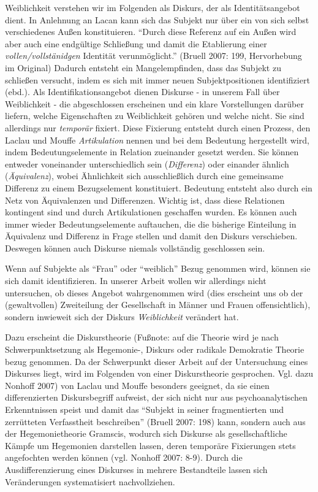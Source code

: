 \documentclass[12pt, titlepage=true, toc=bib]{scrartcl}
\begin{document}
Weiblichkeit verstehen wir im Folgenden als Diskurs, der als Identitätsangebot dient. In Anlehnung an Lacan kann sich das Subjekt nur über ein von sich selbst verschiedenes Außen konstituieren. "`Durch diese Referenz auf ein Außen wird aber auch eine endgültige Schließung und damit die Etablierung einer \textit{vollen/vollstänidgen} Identität verunmöglicht."' (Bruell 2007: 199, Hervorhebung im Original) Dadurch entsteht ein Mangelempfinden, dass das Subjekt zu schließen versucht, indem es sich mit immer neuen Subjektpositionen identifiziert (ebd.). Als Identifikationsangebot dienen Diskurse - in unserem Fall über Weiblichkeit - die abgeschlossen erscheinen und ein klare Vorstellungen darüber liefern, welche Eigenschaften zu Weiblichkeit gehören und welche nicht. Sie sind allerdings nur \textit{temporär} fixiert. Diese Fixierung entsteht durch einen Prozess, den Laclau und Mouffe \textit{Artikulation} nennen und bei dem Bedeutung hergestellt wird, indem Bedeutungselemente in Relation zueinander gesetzt werden. Sie können entweder voneinander unterschiedlich sein (\textit{Differenz}) oder einander ähnlich (\textit{Äquivalenz}), wobei Ähnlichkeit sich ausschließlich durch eine gemeinsame Differenz zu einem Bezugselement konstituiert. Bedeutung entsteht also durch ein Netz von Äquivalenzen und Differenzen. Wichtig ist, dass diese Relationen kontingent sind und durch Artikulationen geschaffen wurden. Es können auch immer wieder Bedeutungselemente auftauchen, die die bisherige Einteilung in Äquivalenz und Differenz in Frage stellen und damit den Diskurs verschieben. Deswegen können auch Diskurse niemals vollständig geschlossen sein. 


Wenn auf Subjekte als "`Frau"' oder "`weiblich"' Bezug genommen wird, können sie sich damit identifizieren. In unserer Arbeit wollen wir allerdings nicht untersuchen, ob dieses Angebot wahrgenommen wird (dies erscheint uns ob der (gewaltvollen) Zweiteilung der Gesellschaft in Männer und Frauen offensichtlich), sondern inwieweit sich der Diskurs \textit{Weiblichkeit} verändert hat. 

Dazu erscheint die Diskurstheorie (Fußnote: auf die Theorie wird je nach Schwerpunktsetzung als Hegemonie-, Diskurs oder radikale Demokratie Theorie bezug genommen. Da der Schwerpunkt dieser Arbeit auf der Untersuchung eines Diskurses liegt, wird im Folgenden von einer Diskurstheorie gesprochen. Vgl. dazu Nonhoff 2007) von Laclau und Mouffe besonders geeignet, da sie einen differenzierten Diskursbegriff aufweist, der sich nicht nur aus psychoanalytischen Erkenntnissen speist und damit das "`Subjekt in seiner fragmentierten und zerrütteten Verfasstheit beschreiben"' (Bruell 2007: 198) kann, sondern auch aus der Hegemonietheorie Gramscis, wodurch sich Diskurse als gesellschaftliche Kämpfe um Hegemonien darstellen lassen, deren temporäre Fixierungen stets angefochten werden können (vgl. Nonhoff 2007: 8-9). Durch die Ausdifferenzierung eines Diskurses in mehrere Bestandteile lassen sich Veränderungen systematisiert nachvollziehen.
\end{document}
